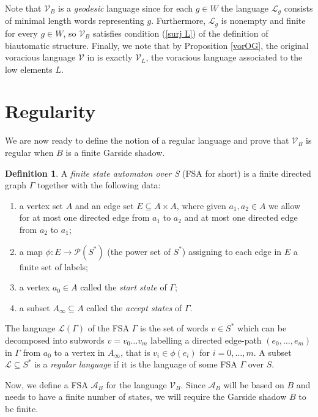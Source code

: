 \documentclass[a4paper,12pt,leqno]{amsart}
\theoremstyle{definition}
\newtheorem{defin}[theorem]{Definition}
\newcommand{\A}{\mathcal{A}}
\newcommand{\V}{\mathcal{V}}
\newcommand{\LL}{\mathcal{L}}
\begin{document}
Note that $\V_B$ is a \emph{geodesic} language since for each $g \in W$ the language $\LL_g$ consists of minimal length words representing $g$. Furthermore, $\LL_g$ is nonempty and finite for every $g \in W$, so $\V_B$ satisfies condition (\ref{surj L}) of the definition of biautomatic structure. Finally, we note that by Proposition \ref{vorOG}, the original voracious language $\V$ in \cite{OP-bi} is exactly $\V_L$, the voracious language associated to the low elements $L$.

\section{Regularity} \label{section regularity}

We are now ready to define the notion of a regular language and prove that $\V_B$ is regular when $B$ is a finite Garside shadow. 

\begin{defin}
    A \emph{finite state automaton over S} (FSA for short) is a finite directed graph $\Gamma$ together with the following data:
    \begin{enumerate}
        \item a vertex set $A$ and an edge set $E \subseteq A \times A$, where given $a_1,a_2 \in A$ we allow for at most one directed edge from $a_1$ to $a_2$ and at most one directed edge from $a_2$ to $a_1$;
        \item a map $\phi : E \to \mathcal{P}(S^*)$ (the power set of $S^*$) assigning to each edge in $E$ a finite set of labels;
        \item a vertex $a_0 \in A$ called the \emph{start state} of $\Gamma$;
        \item a subset $A_{\infty} \subseteq A$ called the \emph{accept states} of $\Gamma$.
    \end{enumerate}
    The language $\LL(\Gamma)$ of the FSA $\Gamma$ is the set of words $v \in S^*$ which can be decomposed into subwords $v = v_0\ldots v_m$ labelling a directed edge-path $(e_0,\ldots,e_m)$ in $\Gamma$ from $a_0$ to a vertex in $A_{\infty}$, that is $v_i \in \phi(e_i)$ for $i=0,\ldots,m$. A subset $\mathcal{L} \subseteq S^*$ is a \emph{regular language} if it is the language of some FSA $\Gamma$ over $S$.
\end{defin}

Now, we define a FSA $\A_B$ for the language $\V_B$. Since $\A_B$ will be based on $B$ and needs to have a finite number of states, we will require the Garside shadow $B$ to be finite. 
\end{document}
